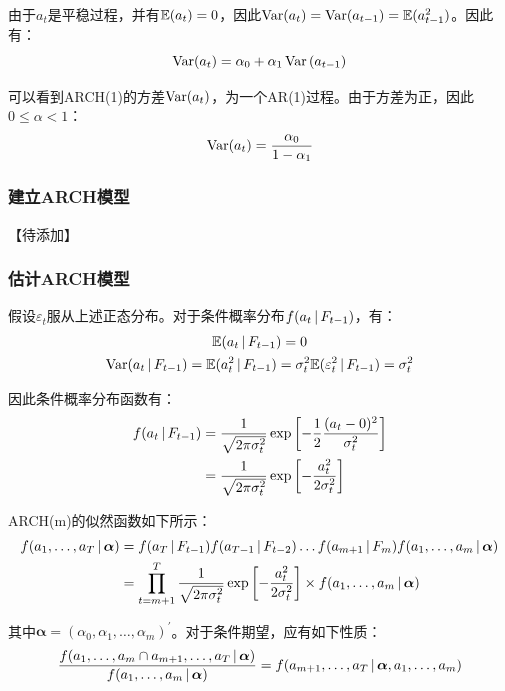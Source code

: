 \documentclass[11pt]{article}
\begin{document}
由于$a_t$是平稳过程，并有$\mathbb{E}(a_t) = 0$，因此$\operatorname{Var}(a_t) = \operatorname{Var}(a_{t-1}) = \mathbb{E}(a_{t-1}^{2})$。因此有：
\begin{equation*}
    \operatorname{Var}(a_t) = \alpha_0 + \alpha_1 \operatorname{Var}\left(a_{t-1}\right)
\end{equation*}

可以看到ARCH(1)的方差$\operatorname{Var}(a_t)$，为一个AR(1)过程。由于方差为正，因此$0 \leq\alpha <1$：
\begin{equation*}
    \operatorname{Var}(a_t) = \frac{\alpha_0}{1-\alpha_1}
\end{equation*}

\subsubsection{建立ARCH模型}

【待添加】

\subsubsection{估计ARCH模型}

假设$\varepsilon_t$服从上述正态分布。对于条件概率分布$f(a_t \,\vert\, F_{t-1})$，有：
\begin{gather*}
    \mathbb{E}(a_t \,\vert\, F_{t-1}) = 0 \\
    \operatorname{Var}(a_t \,\vert\, F_{t-1}) = \mathbb{E}(a_{t}^{2} \,\vert\, F_{t-1}) = \sigma_{t}^{2} \mathbb{E}(\varepsilon_{t}^{2} \,\vert\, F_{t-1}) = \sigma_{t}^{2}
\end{gather*}

因此条件概率分布函数有：
\begin{align*}
    f(a_t \,\vert\, F_{t-1}) 
    &= \frac{1}{\sqrt{2\pi\sigma_{t}^{2}}} \exp\left[ - \frac{1}{2} \frac{(a_t - 0)^2}{\sigma_{t}^{2}} \right]\\
    &= \frac{1}{\sqrt{2\pi\sigma_{t}^{2}}} \exp \left[ -\frac{a_{t}^{2}}{2\sigma_{t}^{2}} \right]
\end{align*}

ARCH(m)的似然函数如下所示：
\begin{align*}
    f(a_1,\dots,a_T \,\vert\, \bm{\alpha}) &= f(a_{T} \,\vert\, F_{t-1}) f(a_{T-1} \,\vert\, F_{t-2}) \dots f(a_{m+1} \,\vert\, F_{m}) f(a_1,\dots,a_m \,\vert\, \bm{\alpha}) \\
    &= \prod_{t=m+1}^{T} \frac{1}{\sqrt{2\pi\sigma_{t}^{2}}} \exp \left[ -\frac{a_{t}^{2}}{2\sigma_{t}^{2}} \right] \times f(a_1,\dots,a_m \,\vert\, \bm{\alpha})
\end{align*}

其中$\bm{\alpha} = (\alpha_0,\alpha_1,\dots,\alpha_m)^{'}$。对于条件期望，应有如下性质：
\begin{equation*}
    \frac{f (a_1,\dots,a_m \cap a_{m+1},\dots,a_T \,\vert\, \bm{\alpha})}{f(a_1,\dots,a_m \,\vert\, \bm{\alpha})}
    = f(a_{m+1},\dots,a_T \,\vert\, \bm{\alpha},a_1,\dots,a_m)
\end{equation*}
\end{document}
